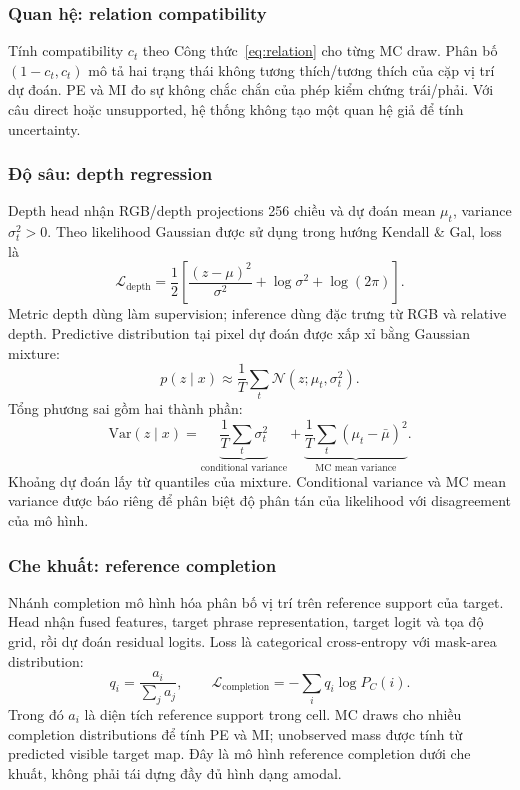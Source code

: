 \documentclass[12pt,a4paper]{article}
\begin{document}
\subsubsection{Quan hệ: relation compatibility}
Tính compatibility $c_t$ theo Công thức~\eqref{eq:relation} cho từng MC draw. Phân bố $(1-c_t,c_t)$ mô tả hai trạng thái không tương thích/tương thích của cặp vị trí dự đoán. PE và MI đo sự không chắc chắn của phép kiểm chứng trái/phải. Với câu direct hoặc unsupported, hệ thống không tạo một quan hệ giả để tính uncertainty.

\subsubsection{Độ sâu: depth regression}
Depth head nhận RGB/depth projections 256 chiều và dự đoán mean $\mu_t$, variance $\sigma_t^2>0$. Theo likelihood Gaussian được sử dụng trong hướng Kendall \& Gal, loss là
\begin{equation}
\mathcal L_{\mathrm{depth}}=\frac12\left[\frac{(z-\mu)^2}{\sigma^2}+\log\sigma^2+\log(2\pi)\right].
\end{equation}
Metric depth dùng làm supervision; inference dùng đặc trưng từ RGB và relative depth. Predictive distribution tại pixel dự đoán được xấp xỉ bằng Gaussian mixture:
\begin{equation}
p(z\mid x)\approx\frac1T\sum_t\mathcal N(z;\mu_t,\sigma_t^2).
\end{equation}
Tổng phương sai gồm hai thành phần:
\begin{equation}
\mathrm{Var}(z\mid x)=\underbrace{\frac1T\sum_t\sigma_t^2}_{\text{conditional variance}}+
\underbrace{\frac1T\sum_t(\mu_t-\bar\mu)^2}_{\text{MC mean variance}}.
\end{equation}
Khoảng dự đoán lấy từ quantiles của mixture. Conditional variance và MC mean variance được báo riêng để phân biệt độ phân tán của likelihood với disagreement của mô hình.

\subsubsection{Che khuất: reference completion}
Nhánh completion mô hình hóa phân bố vị trí trên reference support của target. Head nhận fused features, target phrase representation, target logit và tọa độ grid, rồi dự đoán residual logits. Loss là categorical cross-entropy với mask-area distribution:
\begin{equation}
q_i=\frac{a_i}{\sum_j a_j},\qquad
\mathcal L_{\mathrm{completion}}=-\sum_iq_i\log P_C(i).
\end{equation}
Trong đó $a_i$ là diện tích reference support trong cell. MC draws cho nhiều completion distributions để tính PE và MI; unobserved mass được tính từ predicted visible target map. Đây là mô hình reference completion dưới che khuất, không phải tái dựng đầy đủ hình dạng amodal.
\end{document}

